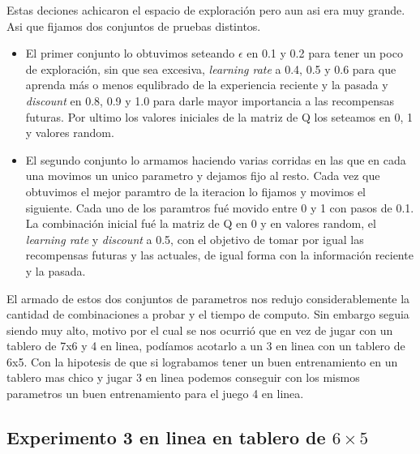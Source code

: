 Estas deciones achicaron el espacio de exploración pero aun asi era muy grande. Asi que fijamos dos conjuntos de pruebas distintos. 

\begin{itemize}
  \item El primer conjunto lo obtuvimos seteando \textbf{$\epsilon$} en 0.1 y 0.2 para tener un poco de exploración, sin que sea excesiva, \textit{learning rate} a 0.4, 0.5 y 0.6 para que aprenda más o menos equlibrado de la experiencia reciente y la pasada y \textit{discount} en 0.8, 0.9 y 1.0 para darle mayor importancia a las recompensas futuras. Por ultimo los valores iniciales de la matriz de Q los seteamos en 0, 1 y valores random. 
   
  \item  El segundo conjunto lo armamos haciendo varias corridas en las que en cada una movimos un unico parametro y dejamos fijo al resto. Cada vez que obtuvimos el mejor paramtro de la iteracion lo fijamos y movimos el siguiente. Cada uno de los paramtros fué movido entre 0 y 1 con pasos de 0.1. La combinación inicial fué la matriz de Q en 0 y en valores random, el \textit{learning rate} y \textit{discount} a 0.5, con el objetivo de tomar por igual las recompensas futuras y las actuales, de igual forma con la información reciente y la pasada. \\
\end{itemize} 

El armado de estos dos conjuntos de parametros nos redujo considerablemente la cantidad de combinaciones a probar y el tiempo de computo. Sin embargo seguia siendo muy alto, motivo por el cual se nos ocurrió que en vez de jugar con un tablero de 7x6 y 4 en linea, podíamos acotarlo a un 3 en linea con un tablero de 6x5. Con la hipotesis de que si lograbamos tener un buen entrenamiento en un tablero mas chico y jugar 3 en linea podemos conseguir con los mismos parametros un buen entrenamiento para el juego 4 en linea.



\subsection{Experimento 3 en linea en tablero de $6\times5$}

